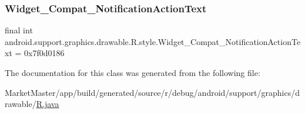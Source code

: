 \mbox{\label{classandroid_1_1support_1_1graphics_1_1drawable_1_1R_1_1style_a490bf3c12ac2da8140c682ca1cda94ed}} 
\subsubsection{\texorpdfstring{Widget\+\_\+\+Compat\+\_\+\+Notification\+Action\+Text}{Widget\_Compat\_NotificationActionText}}
{\footnotesize\ttfamily final int android.\+support.\+graphics.\+drawable.\+R.\+style.\+Widget\+\_\+\+Compat\+\_\+\+Notification\+Action\+Text = 0x7f0d0186\hspace{0.3cm}{\ttfamily [static]}}



The documentation for this class was generated from the following file\+:\begin{DoxyCompactItemize}
\item 
Market\+Master/app/build/generated/source/r/debug/android/support/graphics/drawable/\mbox{\hyperlink{debug_2android_2support_2graphics_2drawable_2R_8java}{R.\+java}}\end{DoxyCompactItemize}
